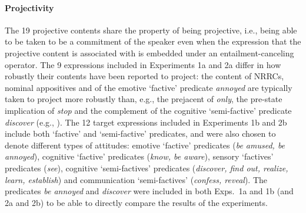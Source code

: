 \documentclass[11pt,fleqn]{article}
\newcommand{\6}{\mbox{$[\hspace*{-.6mm}[$}}
\newcommand{\9}{\mbox{$]\hspace*{-.6mm}]$}}
\begin{document}
\paragraph{Projectivity} The 19 projective contents share the property of being projective, i.e., being able to be taken to be a commitment of the speaker even when the expression that the projective content is associated with is embedded under an entailment-canceling operator. The 9 expressions included in Experiments 1a and 2a differ in how robustly their contents have been reported to project: 
the content of NRRCs, nominal appositives and of the emotive `factive' predicate {\em annoyed} are typically taken to project more robustly than, e.g., the prejacent of {\em only}, the pre-state implication of {\em stop} and the complement of the cognitive `semi-factive' predicate {\em discover} (e.g., \citealt{karttunen71b,simons01,potts05,abusch10,beaver-belly}). The 12 target expressions included in Experiments 1b and 2b include both `factive' and `semi-factive' predicates, and were also chosen to denote different types of attitudes: emotive `factive' predicates ({\em be amused, be annoyed}), cognitive `factive' predicates ({\em know, be aware}), sensory `factives' predicates ({\em see}), cognitive `semi-factives' predicates ({\em discover, find out, realize, learn, establish}) and communication `semi-factives' ({\em confess, reveal}). The predicates {\em be annoyed} and {\em discover} were included in both Exps.~1a and 1b (and 2a and 2b) to be able to directly compare the results of the experiments.

\end{document}
